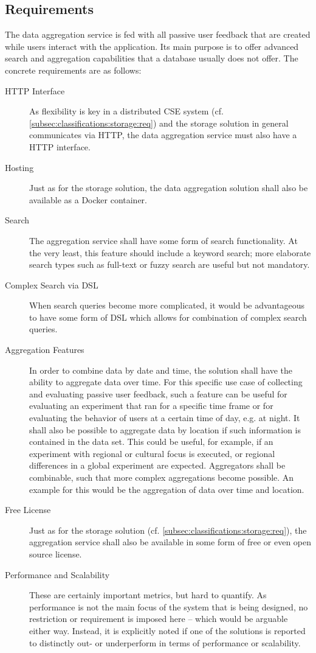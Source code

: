 \subsection{Requirements}

The data aggregation service is fed with all passive user feedback that are created while users interact with the application.
Its main purpose is to offer advanced search and aggregation capabilities that a database usually does not offer.
The concrete requirements are as follows:

\begin{description}
\item [HTTP Interface]
As flexibility is key in a distributed \ac{CSE} system (cf. \cref{subsec:classifications:storage:req}) and the storage solution in general communicates via HTTP, the data aggregation service must also have a HTTP interface.
\item [Hosting]
Just as for the storage solution, the data aggregation solution shall also be available as a Docker container.
\item [Search]
The aggregation service shall have some form of search functionality.
At the very least, this feature should include a keyword search; more elaborate search types such as full-text or fuzzy search are useful but not mandatory.
\item [Complex Search via DSL]
When search queries become more complicated, it would be advantageous to have some form of \ac{DSL} which allows for combination of complex search queries.
\item [Aggregation Features]
In order to combine data by date and time, the solution shall have the ability to aggregate data over time.
For this specific use case of collecting and evaluating passive user feedback, such a feature can be useful for evaluating an experiment that ran for a specific time frame or for evaluating the behavior of users at a certain time of day, e.g. at night.
It shall also be possible to aggregate data by location if such information is contained in the data set.
This could be useful, for example, if an experiment with regional or cultural focus is executed, or regional differences in a global experiment are expected.
Aggregators shall be combinable, such that more complex aggregations become possible.
An example for this would be the aggregation of data over time and location.
\item [Free License]
Just as for the storage solution (cf. \cref{subsec:classifications:storage:req}), the aggregation service shall also be available in some form of free or even open source license.
\item [Performance and Scalability]
These are certainly important metrics, but hard to quantify.
As performance is not the main focus of the system that is being designed, no restriction or requirement is imposed here -- which would be arguable either way.
Instead, it is explicitly noted if one of the solutions is reported to distinctly out- or underperform in terms of performance or scalability.
\end{description}

